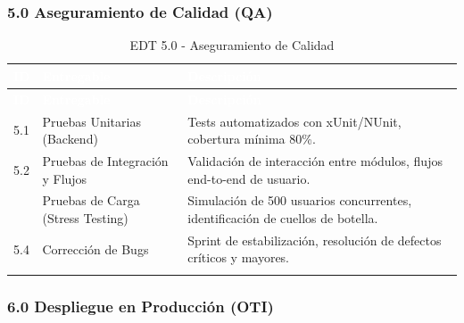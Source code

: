 \documentclass[12pt,a4paper]{article}
\begin{document}
\subsubsection{5.0 Aseguramiento de Calidad (QA)}

\begin{longtable}{|>{\centering\arraybackslash}p{2.5cm}|>{\raggedright\arraybackslash}p{5cm}|>{\raggedright\arraybackslash}p{7cm}|}
\hline
\rowcolor{headercolor}
\textcolor{white}{\textbf{ID}} & \textcolor{white}{\textbf{Entregable}} & \textcolor{white}{\textbf{Descripción}} \\
\hline
\endfirsthead
\hline
\rowcolor{headercolor}
\textcolor{white}{\textbf{ID}} & \textcolor{white}{\textbf{Entregable}} & \textcolor{white}{\textbf{Descripción}} \\
\hline
\endhead
\hline
\endlastfoot

5.1 & Pruebas Unitarias (Backend) & Tests automatizados con xUnit/NUnit, cobertura mínima 80\%. \\
\hline
\rowcolor{rowgray}
5.2 & Pruebas de Integración y Flujos & Validación de interacción entre módulos, flujos end-to-end de usuario. \\
\hline
5.3 & Pruebas de Carga (Stress Testing) & Simulación de 500 usuarios concurrentes, identificación de cuellos de botella. \\
\hline
\rowcolor{rowgray}
5.4 & Corrección de Bugs & Sprint de estabilización, resolución de defectos críticos y mayores. \\
\hline
\caption{EDT 5.0 - Aseguramiento de Calidad}
\end{longtable}

\subsubsection{6.0 Despliegue en Producción (OTI)}
\end{document}
